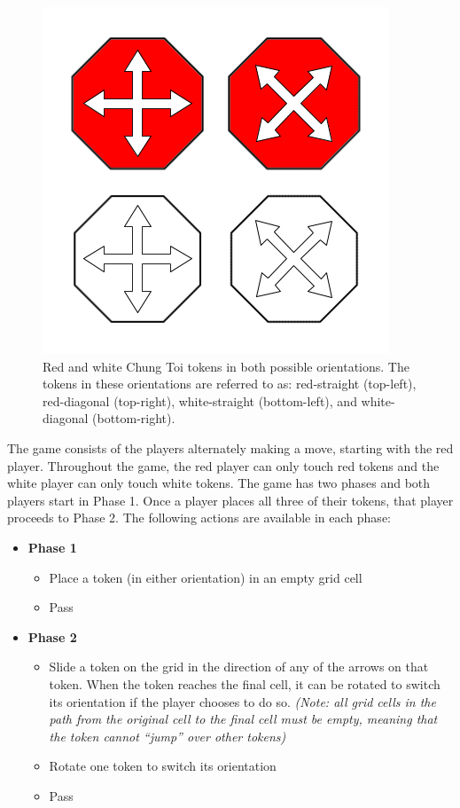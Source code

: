 \documentclass[11pt,a4paper]{report}
\begin{document}
\begin{figure}[htbp]
	\begin{center}
		\includegraphics[width=0.3\linewidth]{chung_toi_tokens.png}
		\caption[Chung Toi tokens]{Red and white Chung Toi tokens in both possible orientations. The tokens in these orientations are referred to as: red-straight (top-left), red-diagonal (top-right), white-straight (bottom-left), and white-diagonal (bottom-right).}
		\label{chung-toi-tokens}
	\end{center}
\end{figure}

The game consists of the players alternately making a move, starting with the red player. Throughout the game, the red player can only touch red tokens and the white player can only touch white tokens. The game has two phases and both players start in Phase 1. Once a player places all three of their tokens, that player proceeds to Phase 2. The following actions are available in each phase:

\begin{itemize}

	\item \textbf{Phase 1}
		\begin{itemize}
			\item Place a token (in either orientation) in an empty grid cell
			\item Pass
		\end{itemize}

	\item \textbf{Phase 2}
		\begin{itemize}
			\item Slide a token on the grid in the direction of any of the arrows on that token. When the token reaches the final cell, it can be rotated to switch its orientation if the player chooses to do so. \emph{(Note: all grid cells in the path from the original cell to the final cell must be empty, meaning that the token cannot ``jump'' over other tokens)}
			\item Rotate one token to switch its orientation
			\item Pass
		\end{itemize}

\end{itemize}
\end{document}
